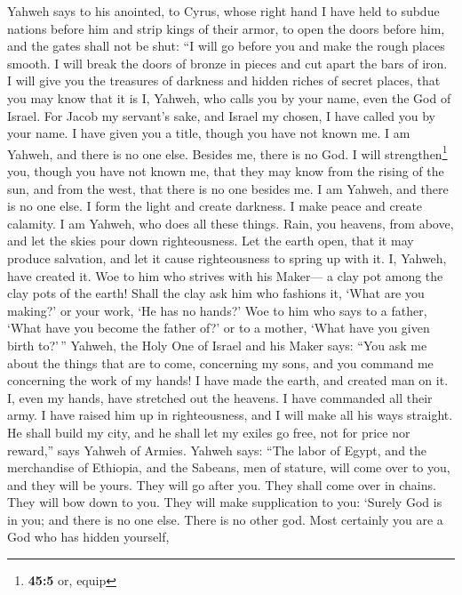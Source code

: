  Yahweh says to his anointed, to Cyrus, whose right hand I
have held to subdue nations before him and strip kings of their armor,
to open the doors before him, and the gates shall not be shut:
 ``I will go before you and make the rough places smooth.
I will break the doors of bronze in pieces and cut apart the bars of
iron.  I will give you the treasures of darkness and
hidden riches of secret places, that you may know that it is I, Yahweh,
who calls you by your name, even the God of Israel.  For
Jacob my servant's sake, and Israel my chosen, I have called you by your
name. I have given you a title, though you have not known me.
 I am Yahweh, and there is no one else. Besides me, there
is no God. I will strengthen\footnote{\textbf{45:5} or, equip} you,
though you have not known me,  that they may know from the
rising of the sun, and from the west, that there is no one besides me. I
am Yahweh, and there is no one else.  I form the light and
create darkness. I make peace and create calamity. I am Yahweh, who does
all these things.  Rain, you heavens, from above, and let
the skies pour down righteousness. Let the earth open, that it may
produce salvation, and let it cause righteousness to spring up with it.
I, Yahweh, have created it.  Woe to him who strives with
his Maker--- a clay pot among the clay pots of the earth! Shall the clay
ask him who fashions it, `What are you making?' or your work, `He has no
hands?'  Woe to him who says to a father, `What have you
become the father of?' or to a mother, `What have you given birth
to?'\,''  Yahweh, the Holy One of Israel and his Maker
says: ``You ask me about the things that are to come, concerning my
sons, and you command me concerning the work of my hands!
 I have made the earth, and created man on it. I, even my
hands, have stretched out the heavens. I have commanded all their army.
 I have raised him up in righteousness, and I will make
all his ways straight. He shall build my city, and he shall let my
exiles go free, not for price nor reward,'' says Yahweh of Armies.
 Yahweh says: ``The labor of Egypt, and the merchandise
of Ethiopia, and the Sabeans, men of stature, will come over to you, and
they will be yours. They will go after you. They shall come over in
chains. They will bow down to you. They will make supplication to you:
`Surely God is in you; and there is no one else. There is no other god.
 Most certainly you are a God who has hidden yourself,
